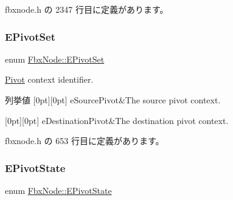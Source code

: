  fbxnode.\+h の 2347 行目に定義があります。

\mbox{\label{class_fbx_node_ae62b7311ac4727654cdf1ebd5cbf7343}} 
\subsubsection{\texorpdfstring{E\+Pivot\+Set}{EPivotSet}}
{\footnotesize\ttfamily enum \hyperlink{class_fbx_node_ae62b7311ac4727654cdf1ebd5cbf7343}{Fbx\+Node\+::\+E\+Pivot\+Set}}

\hyperlink{class_fbx_node_1_1_pivot}{Pivot} context identifier. \begin{DoxyEnumFields}{列挙値}
[0pt][0pt]{}\mbox{\label{class_fbx_node_ae62b7311ac4727654cdf1ebd5cbf7343ae8ed37a5c7e41f8d1cec9d3fa8424b69}} 
e\+Source\+Pivot&The source pivot context. \\
\hline

[0pt][0pt]{}\mbox{\label{class_fbx_node_ae62b7311ac4727654cdf1ebd5cbf7343a9822ce03ebfd64b85ca6a570201eb3cc}} 
e\+Destination\+Pivot&The destination pivot context. \\
\hline

\end{DoxyEnumFields}


 fbxnode.\+h の 653 行目に定義があります。

\mbox{\label{class_fbx_node_a153fc75958227fc6728a2233b630b58a}} 
\subsubsection{\texorpdfstring{E\+Pivot\+State}{EPivotState}}
{\footnotesize\ttfamily enum \hyperlink{class_fbx_node_a153fc75958227fc6728a2233b630b58a}{Fbx\+Node\+::\+E\+Pivot\+State}}

